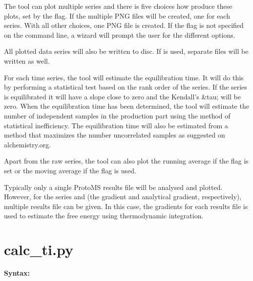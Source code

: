 \documentclass[letterpaper,10pt,english]{sphinxmanual}
\begin{document}
The tool can plot multiple series and there is five choices how produce these plots, set by the  flag. If the  multiple PNG files will be created, one for each series. With all other choices, one PNG file is created. If the  flag is not specified on the command line, a wizard will prompt the user for the different options.

All plotted data series will also be written to disc. If  is used, separate files will be written as well.

For each time series, the tool will estimate the equilibration time. It will do this by performing a statistical test based on the rank order of the series. If the series is equilibrated it will have a slope close to zero and the Kendall's \&tau; will be zero. When the equilibration time has been determined, the tool will estimate the number of independent samples in the production part using the method of statistical inefficiency. The equilibration time will also be estimated from a method that maximizes the number uncorrelated samples as suggested on alchemistry.org.

Apart from the raw series, the tool can also plot the running average if the  flag is set or the moving average if the  flag is used.

Typically only a single ProtoMS results file will be analysed and plotted. However, for the series  and  (the gradient and analytical gradient, respectively), multiple results file can be given. In this case, the gradients for each results file is used to estimate the free energy using thermodynamic integration.


\section{calc\_ti.py}
\label{tools:calc-ti-py}
\textbf{Syntax:}
\end{document}
